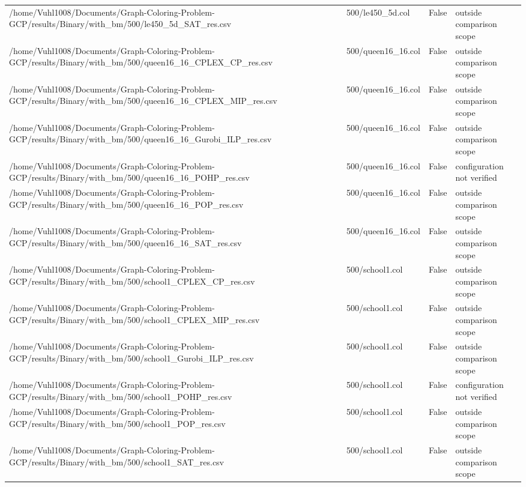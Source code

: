 \begin{table}[htbp]
\begin{tabular}{llll}
/home/Vuhl1008/Documents/Graph-Coloring-Problem-GCP/results/Binary/with\_bm/500/le450\_5d\_SAT\_res.csv & 500/le450\_5d.col & False & outside comparison scope \\
/home/Vuhl1008/Documents/Graph-Coloring-Problem-GCP/results/Binary/with\_bm/500/queen16\_16\_CPLEX\_CP\_res.csv & 500/queen16\_16.col & False & outside comparison scope \\
/home/Vuhl1008/Documents/Graph-Coloring-Problem-GCP/results/Binary/with\_bm/500/queen16\_16\_CPLEX\_MIP\_res.csv & 500/queen16\_16.col & False & outside comparison scope \\
/home/Vuhl1008/Documents/Graph-Coloring-Problem-GCP/results/Binary/with\_bm/500/queen16\_16\_Gurobi\_ILP\_res.csv & 500/queen16\_16.col & False & outside comparison scope \\
/home/Vuhl1008/Documents/Graph-Coloring-Problem-GCP/results/Binary/with\_bm/500/queen16\_16\_POHP\_res.csv & 500/queen16\_16.col & False & configuration not verified \\
/home/Vuhl1008/Documents/Graph-Coloring-Problem-GCP/results/Binary/with\_bm/500/queen16\_16\_POP\_res.csv & 500/queen16\_16.col & False & outside comparison scope \\
/home/Vuhl1008/Documents/Graph-Coloring-Problem-GCP/results/Binary/with\_bm/500/queen16\_16\_SAT\_res.csv & 500/queen16\_16.col & False & outside comparison scope \\
/home/Vuhl1008/Documents/Graph-Coloring-Problem-GCP/results/Binary/with\_bm/500/school1\_CPLEX\_CP\_res.csv & 500/school1.col & False & outside comparison scope \\
/home/Vuhl1008/Documents/Graph-Coloring-Problem-GCP/results/Binary/with\_bm/500/school1\_CPLEX\_MIP\_res.csv & 500/school1.col & False & outside comparison scope \\
/home/Vuhl1008/Documents/Graph-Coloring-Problem-GCP/results/Binary/with\_bm/500/school1\_Gurobi\_ILP\_res.csv & 500/school1.col & False & outside comparison scope \\
/home/Vuhl1008/Documents/Graph-Coloring-Problem-GCP/results/Binary/with\_bm/500/school1\_POHP\_res.csv & 500/school1.col & False & configuration not verified \\
/home/Vuhl1008/Documents/Graph-Coloring-Problem-GCP/results/Binary/with\_bm/500/school1\_POP\_res.csv & 500/school1.col & False & outside comparison scope \\
/home/Vuhl1008/Documents/Graph-Coloring-Problem-GCP/results/Binary/with\_bm/500/school1\_SAT\_res.csv & 500/school1.col & False & outside comparison scope \\

\end{tabular}
\end{table}
